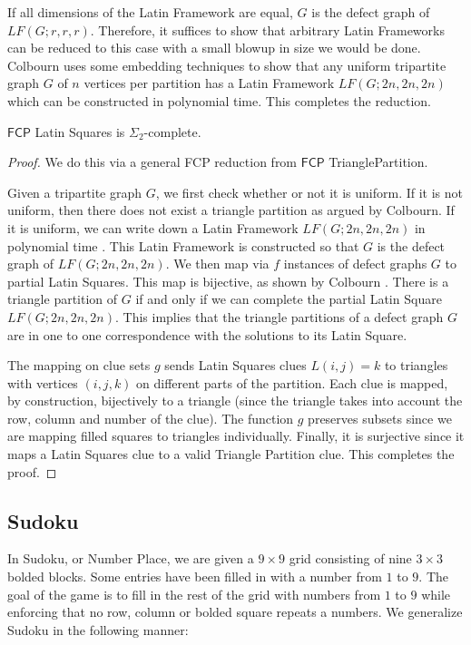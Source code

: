 \documentclass[runningheads,a4paper]{llncs}
\begin{document}
If all dimensions of the Latin Framework are equal, $G$ is the defect graph of $LF(G;r ,r, r)$. Therefore, it suffices to show that arbitrary Latin Frameworks can be reduced to this case with a small blowup in size we would be done. Colbourn uses some embedding techniques to show that any uniform tripartite graph $G$ of $n$ vertices per partition has a Latin Framework $LF(G;2n,2n,2n)$ which can be constructed in polynomial time. This completes the reduction. 

\begin{theorem}
$\mathsf{FCP}$ Latin Squares is $\Sigma_2$-complete.
\end{theorem}

\begin{proof}
We do this via a general FCP reduction from $\mathsf{FCP}$ TrianglePartition.

Given a tripartite graph $G$, we first check whether or not it is uniform. If it is not uniform, then there does not exist a triangle partition as argued by Colbourn. If it is uniform, we can write down a Latin Framework $LF(G;2n,2n,2n)$ in polynomial time \cite{colbourn1984complexity}. This Latin Framework is constructed so that $G$ is the defect graph of $LF(G;2n,2n,2n)$. We then map via $f$ instances of defect graphs $G$ to partial Latin Squares. This map is bijective, as shown by Colbourn \cite{colbourn1984complexity}. There is a triangle partition of $G$ if and only if we can complete the partial Latin Square $LF(G;2n,2n,2n)$. This implies that the triangle partitions of a defect graph $G$ are in one to one correspondence with the solutions to its Latin Square. 

The mapping on clue sets $g$ sends Latin Squares clues $L(i,j) = k$ to triangles with vertices $(i,j,k)$ on different parts of the partition. Each clue is mapped, by construction, bijectively to a triangle (since the triangle takes into account the row, column and number of the clue). The function $g$ preserves subsets since we are mapping filled squares to triangles individually. Finally, it is surjective since it maps a Latin Squares clue to a valid Triangle Partition clue. This completes the proof.

\end{proof}

\subsection{Sudoku}

In Sudoku, or Number Place, we are given a $9 \times 9$ grid consisting of nine $3 \times 3$ bolded blocks. Some entries have been filled in with a number from $1$ to $9$. The goal of the game is to fill in the rest of the grid with numbers from $1$ to $9$ while enforcing that no row, column or bolded square repeats a numbers. We generalize Sudoku in the following manner:
\end{document}
